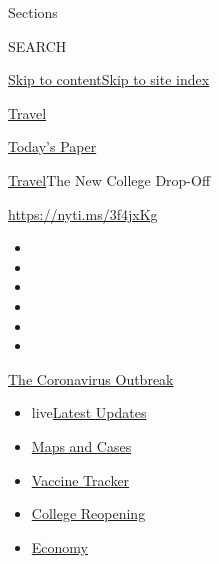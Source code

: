 Sections

SEARCH

\protect\hyperlink{site-content}{Skip to
content}\protect\hyperlink{site-index}{Skip to site index}

\href{https://www.nytimes.com/section/travel}{Travel}

\href{https://myaccount.nytimes.com/auth/login?response_type=cookie\&client_id=vi}{}

\href{https://www.nytimes.com/section/todayspaper}{Today's Paper}

\href{/section/travel}{Travel}\textbar{}The New College Drop-Off

\url{https://nyti.ms/3f4jxKg}

\begin{itemize}
\item
\item
\item
\item
\item
\item
\end{itemize}

\href{https://www.nytimes.com/news-event/coronavirus?action=click\&pgtype=Article\&state=default\&region=TOP_BANNER\&context=storylines_menu}{The
Coronavirus Outbreak}

\begin{itemize}
\tightlist
\item
  live\href{https://www.nytimes.com/2020/08/04/world/coronavirus-cases.html?action=click\&pgtype=Article\&state=default\&region=TOP_BANNER\&context=storylines_menu}{Latest
  Updates}
\item
  \href{https://www.nytimes.com/interactive/2020/us/coronavirus-us-cases.html?action=click\&pgtype=Article\&state=default\&region=TOP_BANNER\&context=storylines_menu}{Maps
  and Cases}
\item
  \href{https://www.nytimes.com/interactive/2020/science/coronavirus-vaccine-tracker.html?action=click\&pgtype=Article\&state=default\&region=TOP_BANNER\&context=storylines_menu}{Vaccine
  Tracker}
\item
  \href{https://www.nytimes.com/2020/08/02/us/covid-college-reopening.html?action=click\&pgtype=Article\&state=default\&region=TOP_BANNER\&context=storylines_menu}{College
  Reopening}
\item
  \href{https://www.nytimes.com/live/2020/08/04/business/stock-market-today-coronavirus?action=click\&pgtype=Article\&state=default\&region=TOP_BANNER\&context=storylines_menu}{Economy}
\end{itemize}


